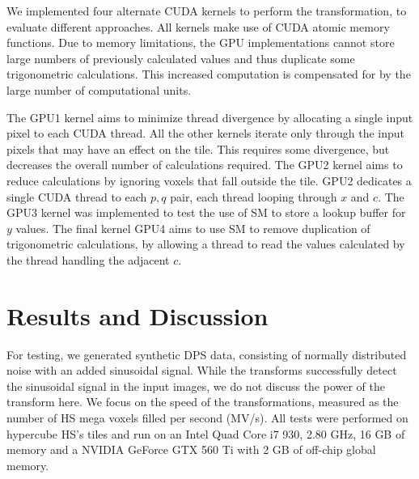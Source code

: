 We implemented four alternate CUDA kernels to perform the transformation, to evaluate different approaches. All kernels make use of CUDA atomic memory functions. Due to memory limitations, the GPU implementations cannot store large numbers of previously calculated values and thus duplicate some trigonometric calculations. This increased computation is compensated for by the large number of computational units.

The GPU1 kernel aims to minimize thread divergence by allocating a single input pixel to each CUDA thread. All the  other kernels iterate only through the input pixels that may have an effect on the tile. This requires some divergence, but decreases the overall number of calculations required. The GPU2 kernel aims to reduce calculations by ignoring voxels that fall outside the tile. GPU2 dedicates a single CUDA thread to each $p,q$ pair, each thread looping through $x$ and $c$. The GPU3 kernel was implemented to test the use of SM to store a lookup buffer for $y$ values. The final kernel GPU4 aims to use SM to remove duplication of trigonometric calculations, by allowing a thread to read the values calculated by the thread handling the adjacent $c$.

\section{Results and Discussion}
\label{eval}

For testing, we generated synthetic DPS data, consisting of normally distributed noise with an added sinusoidal signal. While the transforms successfully detect the sinusoidal signal in the input images, we do not discuss the power of the transform here. We focus on the speed of the transformations, measured as the number of HS mega voxels filled per second (MV/s). All tests were performed on hypercube HS's tiles and run on an Intel Quad Core i7 930, 2.80 GHz, 16 GB of memory and a NVIDIA GeForce GTX 560 Ti with 2 GB of off-chip global memory.

